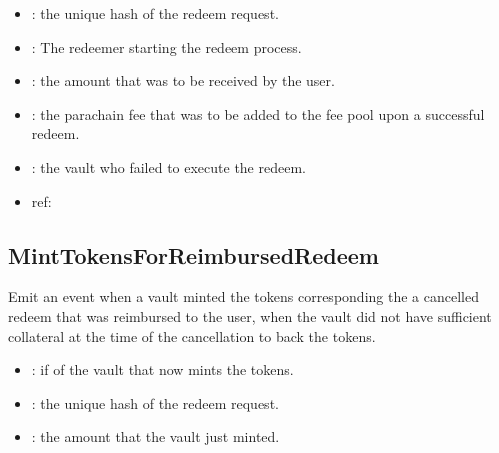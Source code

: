 \documentclass[a4paper,10pt,english]{sphinxmanual}
\begin{document}

\begin{itemize}
\item {} 
: the unique hash of the redeem request.

\item {} 
: The redeemer starting the redeem process.

\item {} 
: the amount that was to be received by the user.

\item {} 
: the parachain fee that was to be added to the fee pool upon a successful redeem.

\item {} 
: the vault who failed to execute the redeem.

\end{itemize}

\begin{itemize}
\item {} 
ref:

\end{itemize}


\subsection{MintTokensForReimbursedRedeem}
\label{\detokenize{spec/redeem:id18}}
Emit an event when a vault minted the tokens corresponding the a cancelled redeem that was reimbursed to the user, when the vault did not have sufficient collateral at the time of the cancellation to back the tokens.



\begin{itemize}
\item {} 
: if of the vault that now mints the tokens.

\item {} 
: the unique hash of the redeem request.

\item {} 
: the amount that the vault just minted.

\end{itemize}
\end{document}
